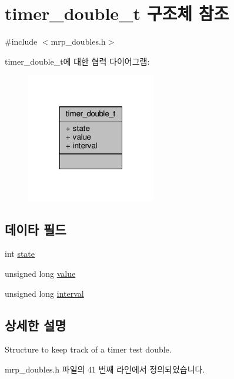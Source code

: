 \hypertarget{structtimer__double__t}{}\section{timer\+\_\+double\+\_\+t 구조체 참조}
\label{structtimer__double__t}


{\ttfamily \#include $<$mrp\+\_\+doubles.\+h$>$}



timer\+\_\+double\+\_\+t에 대한 협력 다이어그램\+:
\nopagebreak
\begin{figure}[H]
\begin{center}
\leavevmode
\includegraphics[width=160pt]{structtimer__double__t__coll__graph}
\end{center}
\end{figure}
\subsection*{데이타 필드}
\begin{DoxyCompactItemize}
\item 
int \hyperlink{structtimer__double__t_a89f234133d3efe315836311cbf21c64b}{state}
\item 
unsigned long \hyperlink{structtimer__double__t_a960ce105570c5c1bdca764f2d8d32a2d}{value}
\item 
unsigned long \hyperlink{structtimer__double__t_aaaceac04637cd33a7f3fffdd1711e6c5}{interval}
\end{DoxyCompactItemize}


\subsection{상세한 설명}
Structure to keep track of a timer test double. 

mrp\+\_\+doubles.\+h 파일의 41 번째 라인에서 정의되었습니다.



